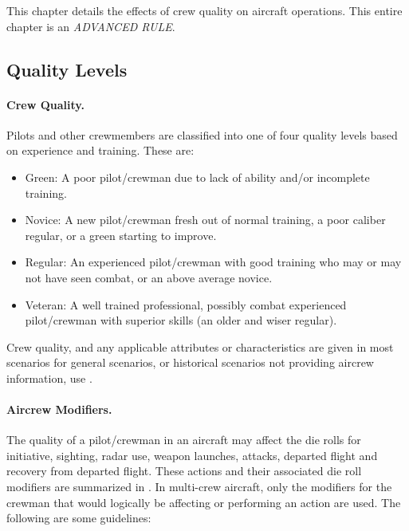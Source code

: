
\label{rule:crew-ability}

This chapter details the effects of crew quality on aircraft operations. This entire chapter is an \emph{ADVANCED RULE}.

\begin{advancedrules}

\section{Quality Levels}
\paragraph{Crew Quality.} Pilots and other crewmembers are classified into one of four quality levels based on experience and training. These are:

\begin{itemize}
    \item Green: A poor pilot/crewman due to lack of ability and/or incomplete training.
    \item Novice: A new pilot/crewman fresh out of normal training, a poor caliber regular, or a green starting to improve.
    \item Regular: An experienced pilot/crewman with good training who may or may not have seen combat, or an above average novice.
    \item Veteran: A well trained professional, possibly combat experienced pilot/crewman with superior skills (an older and wiser regular).
\end{itemize}


Crew quality, and any applicable attributes or characteristics are given in most scenarios for general scenarios, or historical scenarios not providing aircrew information, use .


\paragraph{Aircrew Modifiers.} The quality of a pilot/crewman in an aircraft may affect the die rolls for initiative, sighting, radar use, weapon launches, attacks, departed flight and recovery from departed flight. These actions and their associated die roll modifiers are summarized in . In multi-crew aircraft, only the modifiers for the crewman that would logically be affecting or performing an action are used. The following are some guidelines:


\end{advancedrules}
